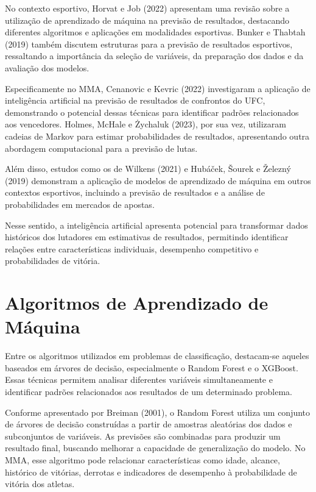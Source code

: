\documentclass[12pt,a4paper]{report}
\begin{document}
No contexto esportivo, Horvat e Job (2022) apresentam uma revisão sobre a utilização de aprendizado de máquina na previsão de resultados, destacando diferentes algoritmos e aplicações em modalidades esportivas. Bunker e Thabtah (2019) também discutem estruturas para a previsão de resultados esportivos, ressaltando a importância da seleção de variáveis, da preparação dos dados e da avaliação dos modelos.

Especificamente no MMA, Cenanovic e Kevric (2022) investigaram a aplicação de inteligência artificial na previsão de resultados de confrontos do UFC, demonstrando o potencial dessas técnicas para identificar padrões relacionados aos vencedores. Holmes, McHale e Żychaluk (2023), por sua vez, utilizaram cadeias de Markov para estimar probabilidades de resultados, apresentando outra abordagem computacional para a previsão de lutas.

Além disso, estudos como os de Wilkens (2021) e Hubáček, Šourek e Železný (2019) demonstram a aplicação de modelos de aprendizado de máquina em outros contextos esportivos, incluindo a previsão de resultados e a análise de probabilidades em mercados de apostas.

Nesse sentido, a inteligência artificial apresenta potencial para transformar dados históricos dos lutadores em estimativas de resultados, permitindo identificar relações entre características individuais, desempenho competitivo e probabilidades de vitória.

\section{Algoritmos de Aprendizado de Máquina}

Entre os algoritmos utilizados em problemas de classificação, destacam-se aqueles baseados em árvores de decisão, especialmente o Random Forest e o XGBoost. Essas técnicas permitem analisar diferentes variáveis simultaneamente e identificar padrões relacionados aos resultados de um determinado problema.

Conforme apresentado por Breiman (2001), o Random Forest utiliza um conjunto de árvores de decisão construídas a partir de amostras aleatórias dos dados e subconjuntos de variáveis. As previsões são combinadas para produzir um resultado final, buscando melhorar a capacidade de generalização do modelo. No MMA, esse algoritmo pode relacionar características como idade, alcance, histórico de vitórias, derrotas e indicadores de desempenho à probabilidade de vitória dos atletas.
\end{document}
